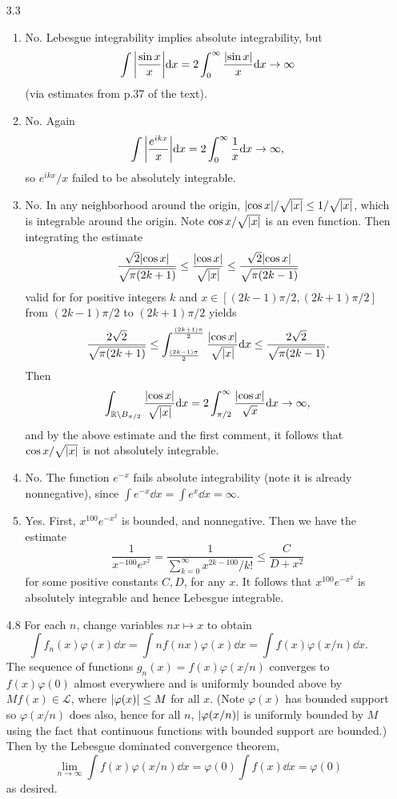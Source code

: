 \documentclass[11pt]{article}
\begin{document}
\begin{enumerate}
    \item[3.3] \begin{enumerate}
        \item No. Lebesgue integrability implies absolute integrability, but \[\int \abs{\frac{\sin x}{x}}\dd x = 2\int_0^\infty \frac{\abs{\sin x}}{x}\dd x \to \infty\] (via estimates from p.37 of the text).
        \item No. Again \[\int \abs{\frac{e^{ikx}}{x}}\dd x = 2\int_0^\infty \frac{1}{x}\dd x\to \infty ,\] so $e^{ikx}/x$ failed to be absolutely integrable.
        \item No. In any neighborhood around the origin, $\abs{ \cos x}/\sqrt{\abs{x}}\leq 1/\sqrt{\abs{x}}$, which is integrable around the origin. Note $\cos x/\sqrt{\abs{x}}$ is an even function. Then integrating the estimate \[\frac{\sqrt 2\abs{\cos x}}{\sqrt{\pi(2k+1)}}\leq \frac{\abs{\cos x}}{\sqrt{\abs{x}}}\leq \frac{\sqrt 2\abs{\cos x}}{\sqrt{\pi(2k-1)}}\] valid for for positive integers $k$ and $x\in [(2k-1)\pi/2,(2k+1)\pi/2]$ from $(2k-1)\pi/2$ to $(2k+1)\pi/2$ yields \[\frac{2\sqrt 2}{\sqrt{\pi(2k+1)}}\leq \int_{\frac{(2k-1)\pi}{2}}^{\frac{(2k+1)\pi}{2}}\frac{\abs{\cos x}}{\sqrt{\abs{x}}}\dd x\leq \frac{2\sqrt 2}{\sqrt{\pi(2k-1)}}.\] Then \[\int_{\mathbb{R}\setminus B_{\pi/2}} \frac{\abs{\cos x}}{\sqrt{\abs{x}}}\dd x = 2\int_{\pi/2}^\infty \frac{\abs{\cos x}}{\sqrt{x}}\dd x\to \infty,\] and by the above estimate and the first comment, it follows that $\cos x /\sqrt{\abs{x}}$ is not absolutely integrable.
        \item No. The function $e^{-x}$ fails absolute integrability (note it is already nonnegative), since $\int e^{-x}\dd x = \int e^x \dd x = \infty$.
        \item Yes. First, $x^{100}e^{-x^2}$ is bounded, and nonnegative. Then we have the estimate \[\frac{1}{x^{-100}e^{x^2}} = \frac{1}{\sum_{k=0}^\infty x^{2k-100}/k!}\leq \frac{C}{D+x^2}\] for some positive constants $C,D$, for any $x$. It follows that $x^{100}e^{-x^2}$ is absolutely integrable and hence Lebesgue integrable.
    \end{enumerate}
    \hrulefill
    \item[4.8] For each $n$, change variables $nx\mapsto x$ to obtain \[\int f_n(x)\varphi(x)\dd x = \int nf(nx)\varphi(x)\dd x = \int f(x)\varphi(x/n)\dd x.\] The sequence of functions $g_n(x) = f(x)\varphi(x/n)$ converges to $f(x)\varphi(0)$ almost everywhere and is uniformly bounded above by $Mf(x)\in \mathcal L$, where $\abs{\varphi(x)}\leq M$ for all $x$. (Note $\varphi(x)$ has bounded support so $\varphi(x/n)$ does also, hence for all $n$, $\abs{\varphi(x/n)}$ is uniformly bounded by $M$ using the fact that continuous functions with bounded support are bounded.) Then by the Lebesgue dominated convergence theorem, \[\lim_{n\to\infty} \int f(x)\varphi(x/n)\dd x = \varphi(0)\int f(x)\dd x= \varphi(0)\] as desired.
    

\end{enumerate}
\end{document}

